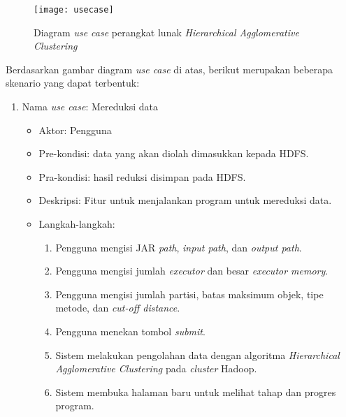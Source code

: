 \begin{figure}[H]
    \centering  
    \texttt{[image: usecase]}  
    \caption[Diagram \textit{use case} perangkat lunak \textit{Hierarchical Agglomerative Clustering}]{Diagram \textit{use case} perangkat lunak \textit{Hierarchical Agglomerative Clustering}} 
    \label{fig:usecase} 
\end{figure}

Berdasarkan gambar diagram \textit{use case} di atas, berikut merupakan beberapa skenario yang dapat terbentuk:

\begin{enumerate}

\item Nama \textit{use case}: Mereduksi data

\begin{itemize}
\item Aktor: Pengguna

\item Pre-kondisi: data yang akan diolah dimasukkan kepada HDFS.

\item Pra-kondisi: hasil reduksi disimpan pada HDFS.

\item Deskripsi: Fitur untuk menjalankan program untuk mereduksi data.

\item Langkah-langkah:

\begin{enumerate}

\item Pengguna mengisi JAR \textit{path}, \textit{input path}, dan \textit{output path}.

\item Pengguna mengisi jumlah \textit{executor} dan besar \textit{executor memory}.

\item Pengguna mengisi jumlah partisi, batas maksimum objek, tipe metode, dan \textit{cut-off distance}. 

\item Pengguna menekan tombol \textit{submit}.

\item Sistem melakukan pengolahan data dengan algoritma \textit{Hierarchical Agglomerative Clustering} pada \textit{cluster} Hadoop.

\item Sistem membuka halaman baru untuk melihat tahap dan progres program.


\end{enumerate}
\end{itemize}
\end{enumerate}
